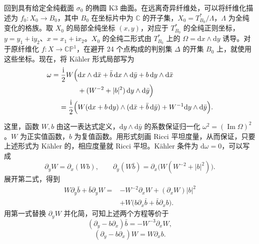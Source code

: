 回到具有给定全纯截面 $\sigma_0$ 的椭圆 K3 曲面。在远离奇异纤维处，可以将纤维化描述为 $f_0\colon X_0\to B_0$，其中 $B_0$ 在坐标片中为 $\mathbb C$ 的开子集，$X_0=T^*_{B_0}/\Lambda$，$\Lambda$ 为全纯变化的格族。取 $X_0$ 的局部全纯坐标 $(x,y)$，对应于 $T^*_{B_0}$ 的全纯正则坐标，$y=y_1+\mathrm i y_2$、$x=x_1+\mathrm i x_2$。$X_0$ 的全纯二形式由 $T^*_{B_0}$ 上的 $\Omega=\mathrm dx\wedge\mathrm dy$ 诱导。对于原纤维化 $f\colon X\to\mathbb{CP}^1$，在避开 24 个点构成的判别集 $\Delta$ 的开集 $B_0$ 上，就使用这些坐标。现在，将 Kähler 形式局部写为
\[
\begin{aligned}
\omega=\frac{\mathrm i}2W\Bigl(&\mathrm dx\wedge\mathrm d\bar x
+\bar b\,\mathrm dx\wedge\mathrm d\bar y
+b\,\mathrm dy\wedge\mathrm d\bar x\\
&+(W^{-2}+|b|^2)\,\mathrm dy\wedge\mathrm d\bar y\Bigr)\\
=\frac{\mathrm i}2\Bigl(&W(\mathrm dx+b\,\mathrm dy)
\wedge(\mathrm d\bar x+\bar b\,\mathrm d\bar y)
+W^{-1}\mathrm dy\wedge\mathrm d\bar y\Bigr).
\end{aligned}
\]

这里，函数 $W,b$ 由这一表达式定义，$\mathrm dy\wedge\mathrm d\bar y$ 的系数保证归一化 $\omega^2=(\operatorname{Im}\Omega)^2$。$W$ 为正实值函数，$b$ 为复值函数。用形式刻画 Ricci 平坦度量，从而保证，只要上述形式为 Kähler 的，相应度量就 Ricci 平坦。Kähler 条件为 $\mathrm d\omega=0$，可以写成
\[
\partial_yW=\partial_x(Wb),\qquad
\partial_y(W\bar b)=\partial_x\bigl(W(W^{-2}+|b|^2)\bigr).
\]
展开第二式，得到
\[
\begin{aligned}
W\partial_y\bar b+\bar b\partial_yW
={}&-W^{-2}\partial_xW+(\partial_xW)|b|^2\\
&+W\bigl(b\partial_x\bar b+\bar b\partial_xb\bigr).
\end{aligned}
\]
用第一式替换 $\partial_yW$ 并化简，可知上述两个方程等价于
\begin{equation*}\tag{K1}\label{eq:7.K1}
(\partial_y-b\partial_x)\bar b=-W^{-3}\partial_xW,
\end{equation*}
\begin{equation*}\tag{K2}\label{eq:7.K2}
(\partial_y-b\partial_x)W=W\partial_xb.
\end{equation*}


